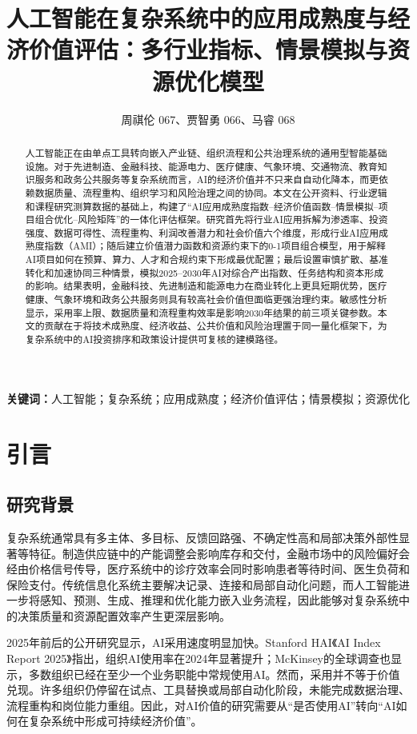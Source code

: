 \documentclass[UTF8,a4paper,12pt]{ctexart}
\title{人工智能在复杂系统中的应用成熟度与经济价值评估：多行业指标、情景模拟与资源优化模型}
\author{周祺伦 067、贾智勇 066、马睿 068}
\date{}
\begin{document}
\maketitle

\begin{abstract}
人工智能正在由单点工具转向嵌入产业链、组织流程和公共治理系统的通用型智能基础设施。对于先进制造、金融科技、能源电力、医疗健康、气象环境、交通物流、教育知识服务和政务公共服务等复杂系统而言，AI的经济价值并不只来自自动化降本，而更依赖数据质量、流程重构、组织学习和风险治理之间的协同。本文在公开资料、行业逻辑和课程研究测算数据的基础上，构建了“AI应用成熟度指数--经济价值函数--情景模拟--项目组合优化--风险矩阵”的一体化评估框架。研究首先将行业AI应用拆解为渗透率、投资强度、数据可得性、流程重构、利润改善潜力和社会价值六个维度，形成行业AI应用成熟度指数（AMI）；随后建立价值潜力函数和资源约束下的0-1项目组合模型，用于解释AI项目如何在预算、算力、人才和合规约束下形成最优配置；最后设置审慎扩散、基准转化和加速协同三种情景，模拟2025--2030年AI对综合产出指数、任务结构和资本形成的影响。结果表明，金融科技、先进制造和能源电力在商业转化上更具短期优势，医疗健康、气象环境和政务公共服务则具有较高社会价值但面临更强治理约束。敏感性分析显示，采用率上限、数据质量和流程重构效率是影响2030年结果的前三项关键参数。本文的贡献在于将技术成熟度、经济收益、公共价值和风险治理置于同一量化框架下，为复杂系统中的AI投资排序和政策设计提供可复核的建模路径。
\end{abstract}

\noindent\textbf{关键词：}人工智能；复杂系统；应用成熟度；经济价值评估；情景模拟；资源优化

\clearpage
\tableofcontents
\clearpage

\section{引言}
\subsection{研究背景}
复杂系统通常具有多主体、多目标、反馈回路强、不确定性高和局部决策外部性显著等特征。制造供应链中的产能调整会影响库存和交付，金融市场中的风险偏好会经由价格信号传导，医疗系统中的诊疗效率会同时影响患者等待时间、医生负荷和保险支付。传统信息化系统主要解决记录、连接和局部自动化问题，而人工智能进一步将感知、预测、生成、推理和优化能力嵌入业务流程，因此能够对复杂系统中的决策质量和资源配置效率产生更深层影响。

2025年前后的公开研究显示，AI采用速度明显加快。Stanford HAI《AI Index Report 2025》指出，组织AI使用率在2024年显著提升；McKinsey的全球调查也显示，多数组织已经在至少一个业务职能中常规使用AI。然而，采用并不等于价值兑现。许多组织仍停留在试点、工具替换或局部自动化阶段，未能完成数据治理、流程重构和岗位能力重组。因此，对AI价值的研究需要从“是否使用AI”转向“AI如何在复杂系统中形成可持续经济价值”。
\end{document}
